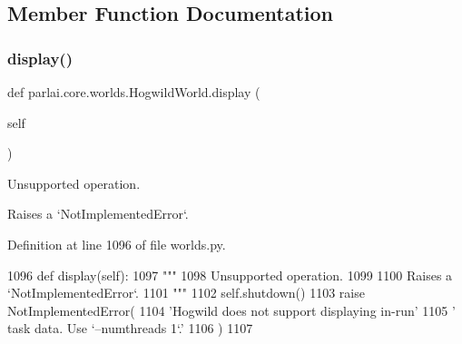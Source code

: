 \subsection{Member Function Documentation}
\mbox{\label{classparlai_1_1core_1_1worlds_1_1HogwildWorld_a1b7aed0a7b56712f22ee8b04c65d7c00}} 
\subsubsection{\texorpdfstring{display()}{display()}}
{\footnotesize\ttfamily def parlai.\+core.\+worlds.\+Hogwild\+World.\+display (\begin{DoxyParamCaption}\item[{}]{self }\end{DoxyParamCaption})}

\begin{DoxyVerb}Unsupported operation.

Raises a `NotImplementedError`.
\end{DoxyVerb}
 

Definition at line 1096 of file worlds.\+py.


\begin{DoxyCode}
1096     \textcolor{keyword}{def }display(self):
1097         \textcolor{stringliteral}{"""}
1098 \textcolor{stringliteral}{        Unsupported operation.}
1099 \textcolor{stringliteral}{}
1100 \textcolor{stringliteral}{        Raises a `NotImplementedError`.}
1101 \textcolor{stringliteral}{        """}
1102         self.shutdown()
1103         \textcolor{keywordflow}{raise} NotImplementedError(
1104             \textcolor{stringliteral}{'Hogwild does not support displaying in-run'}
1105             \textcolor{stringliteral}{' task data. Use `--numthreads 1`.'}
1106         )
1107 
\end{DoxyCode}
\mbox{\label{classparlai_1_1core_1_1worlds_1_1HogwildWorld_a0425099fbc33cb97d6fbe67dbd2e8a1f}} 
